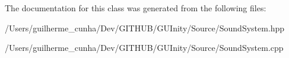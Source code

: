 The documentation for this class was generated from the following files\+:\begin{DoxyCompactItemize}
\item 
/\+Users/guilherme\+\_\+cunha/\+Dev/\+G\+I\+T\+H\+U\+B/\+G\+U\+Inity/\+Source/Sound\+System.\+hpp\item 
/\+Users/guilherme\+\_\+cunha/\+Dev/\+G\+I\+T\+H\+U\+B/\+G\+U\+Inity/\+Source/Sound\+System.\+cpp\end{DoxyCompactItemize}
